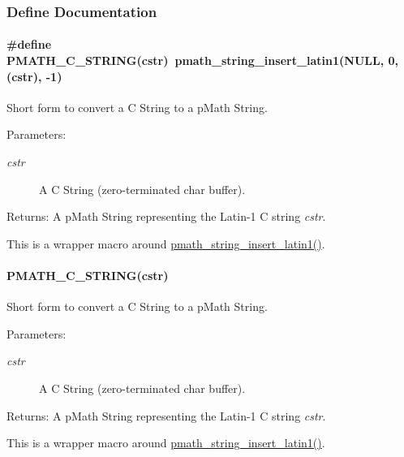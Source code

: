 \subsubsection{Define Documentation}
\hypertarget{group__strings_g0b6ecb1bc5d8aeccbbfaeb72055c7ffc}{
\paragraph[{PMATH\_\-C\_\-STRING}]{\setlength{\rightskip}{0pt plus 5cm}\#define PMATH\_\-C\_\-STRING(cstr)~pmath\_\-string\_\-insert\_\-latin1(NULL, 0, (cstr), -1)}\hfill}
\label{group__strings_g0b6ecb1bc5d8aeccbbfaeb72055c7ffc}


Short form to convert a C String to a pMath String. 

\begin{Desc}
\item[Parameters:]
\begin{description}
\item[{\em cstr}]A C String (zero-terminated char buffer). \end{description}
\end{Desc}
\begin{Desc}
\item[Returns:]A pMath String representing the Latin-1 C string {\em cstr\/}.\end{Desc}
This is a wrapper macro around \hyperlink{group__strings_g0016e7daa5ca421a48b6d8bd3c5f7ff5}{pmath\_\-string\_\-insert\_\-latin1()}. \hypertarget{group__strings_g63b8849d6cfcfa9d73bd404d7a4071c0}{
\paragraph[{PMATH\_\-C\_\-STRING}]{\setlength{\rightskip}{0pt plus 5cm}PMATH\_\-C\_\-STRING(cstr)}\hfill}
\label{group__strings_g63b8849d6cfcfa9d73bd404d7a4071c0}


Short form to convert a C String to a pMath String. 

\begin{Desc}
\item[Parameters:]
\begin{description}
\item[{\em cstr}]A C String (zero-terminated char buffer). \end{description}
\end{Desc}
\begin{Desc}
\item[Returns:]A pMath String representing the Latin-1 C string {\em cstr\/}.\end{Desc}
This is a wrapper macro around \hyperlink{group__strings_g0016e7daa5ca421a48b6d8bd3c5f7ff5}{pmath\_\-string\_\-insert\_\-latin1()}. 

